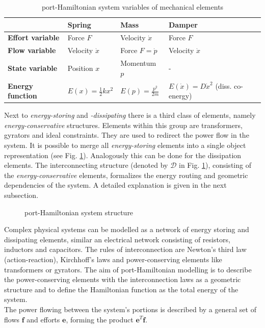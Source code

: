 \documentclass[a4paper,twoside, openright,12pt]{report}
\newcommand{\f}[1]{\boldsymbol{#1}}
\begin{document}
{\begin{table}
	\centering
	\caption[port-Hamiltonian system variables of mechanical elements]{port-Hamiltonian system variables of mechanical elements}\vspace{10pt}
	\label{TAB:PHSvar_mechanic}
	
	\begin{tabular}{ l | l | l | l }
		& \textbf{Spring} & \textbf{Mass} & \textbf{Damper} \\ \hline
		\textbf{Effort variable} & Force $F$ & Velocity $\dot{x}$ & Force $ F $ \\ \hline
		\textbf{Flow variable} & Velocity $ \dot{x} $ & Force $ F = \dot{p} $ & Velocity $ \dot{x} $ \\ \hline
		\textbf{State variable} & Position $x$ & Momentum $ p $ & - \\ \hline
		\textbf{Energy function} & $ E(x) = \frac{1}{2}kx^2 $ & $ E(p) = \frac{p^2}{2m} $ & $E(\dot{x}) = D\dot{x}^2  $ (diss. co-energy) \\ 
	\end{tabular}
\end{table}

Next to \emph{energy-storing} and \emph{-dissipating} there is a third class of elements, namely \emph{energy-conservative} structures. Elements within this group are transformers, gyrators and ideal constraints. They are used to redirect the power flow in the system. It is possible to merge all \emph{energy-storing} elements into a single object representation (see Fig. \ref{FIG:pHsstructure}). Analogously this can be done for the dissipation elements. The interconnecting structure (denoted by $\mathcal{D}$ in Fig. \ref{FIG:pHsstructure}), consisting of the \emph{energy-conservative} elements, formalizes the energy routing and geometric dependencies of the system. A detailed explanation is given in the next subsection.


\begin{figure}[b!]
	\centering
	\small
	\def\svgwidth{0.6\columnwidth}
	
	\caption{port-Hamiltonian system structure}
	\label{FIG:pHsstructure}
\end{figure}

Complex physical systems can be modelled as a network of energy storing and dissipating elements, similar an electrical network consisting of resistors, inductors and capacitors. The rules of interconnection are Newton's third law (action-reaction), Kirchhoff's laws and power-conserving elements like transformers or gyrators. The aim of port-Hamiltonian modelling is to describe the power-conserving elements with the interconnection laws as a geometric structure and to define the Hamiltonian function as the total energy of the system. \\
The power flowing between the system's portions is described by a general set of flows $\f{f}$ and efforts $\f{e}$, forming the product $\f{e}^T\f{f}$.

}
\end{document}
